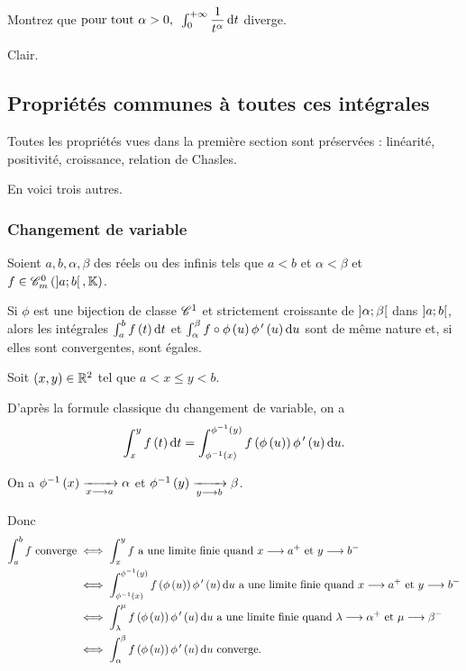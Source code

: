 \begin{exo}
Montrez que \(\quantifs{\tpt\alpha>0}\int_0^{\pinf}\dfrac{1}{t^\alpha}\odif{t}\) diverge.
\end{exo}

\begin{corr}
Clair.
\end{corr}

\subsection{Propriétés communes à toutes ces intégrales}

Toutes les propriétés vues dans la première section sont préservées : linéarité, positivité, croissance, relation de Chasles.

En voici trois autres.

\subsubsection{Changement de variable}

\begin{prop}
Soient \(a,b,\alpha,\beta\) des réels ou des infinis tels que \(a<b\) et \(\alpha<\beta\) et \(f\in\contm[\intervee{a}{b}]\).

Si \(\phi\) est une bijection de classe \(\mathscr{C}^{1}\) et strictement croissante de \(\left]\alpha;\beta\right[\) dans \(\left]a;b\right[\), alors les intégrales \(\int_a^bf\paren{t}\odif{t}\) et \(\int_\alpha^\beta f\rond\phi\paren{u}\phi\prim\paren{u}\odif{u}\) sont de même nature et, si elles sont convergentes, sont égales.
\end{prop}

\begin{dem}
Soit \(\left(x,y\right)\in\mathbb{R}^2\) tel que \(a<x\leq y<b\).

D'après la formule classique du changement de variable, on a \[\int_x^yf\paren{t}\odif{t}=\int_{\phi\inv\paren{x}}^{\phi\inv\paren{y}}f\paren{\phi\paren{u}}\phi\prim\paren{u}\odif{u}.\]

On a \(\phi^{-1}\left(x\right)\xrightarrow[x\longrightarrow a]{}\alpha\) et \(\phi^{-1}\left(y\right)\xrightarrow[y\longrightarrow b]{}\beta\).

Donc \[\begin{aligned}
\int_a^bf\text{ converge}&\ssi\int_x^yf\text{ a une limite finie quand }x\to a^+\text{ et }y\to b^- \\
&\ssi\int_{\phi\inv\paren{x}}^{\phi\inv\paren{y}}f\paren{\phi\paren{u}}\phi\prim\paren{u}\odif{u}\text{ a une limite finie quand }x\to a^+\text{ et }y\to b^- \\
&\ssi\int_\lambda^\mu f\paren{\phi\paren{u}}\phi\prim\paren{u}\odif{u}\text{ a une limite finie quand }\lambda\to\alpha^+\text{ et }\mu\to\beta^- \\
&\ssi\int_\alpha^\beta f\paren{\phi\paren{u}}\phi\prim\paren{u}\odif{u}\text{ converge}.
\end{aligned}\]
\end{dem}

